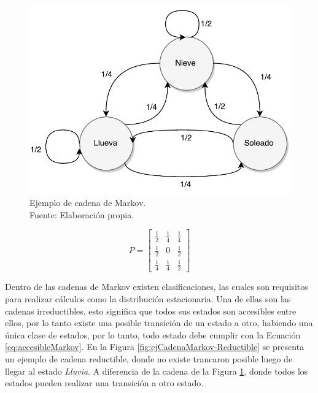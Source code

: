 \begin{figure}[ht!]
	\centering
	\includegraphics[scale=0.5]{images/EjCadenaMarkov.pdf}
	\caption[Ejemplo de cadena de Markov.]{Ejemplo de cadena de Markov.\\Fuente: Elaboración propia.}
	\label{fig:ejCadenaMarkov}
\end{figure}

\begin{equation} \label{eq:ejCadenaMarkov}
	P =
	\begin{bmatrix}
		\frac{1}{2} & \frac{1}{4} & \frac{1}{4} \\
		\frac{1}{2} & 0 & \frac{1}{2} \\
		\frac{1}{4} & \frac{1}{4} & \frac{1}{2}
	\end{bmatrix}	
\end{equation}

\normalsize{Dentro de las cadenas de Markov existen clasificaciones, las cuales son requisitos para realizar c\'alculos como la distribuci\'on estacionaria. Una de ellas son las cadenas irreductibles, esto significa que todos sus estados son accesibles entre ellos, por lo tanto existe una posible transici\'on de un estado a otro, habiendo una \'unica clase de estados, por lo tanto, todo estado debe cumplir con la Ecuaci\'on} \ref{eq:accesibleMarkov}. \normalsize{En la Figura} \ref{fig:ejCadenaMarkov-Reductible} \normalsize{se presenta un ejemplo de cadena reductible, donde no existe trancaron posible luego de llegar al estado \textit{Lluvia}. A diferencia de la cadena de la Figura} \ref{fig:ejCadenaMarkov}, \normalsize{donde todos los estados pueden realizar una transici\'on a otro estado.}

